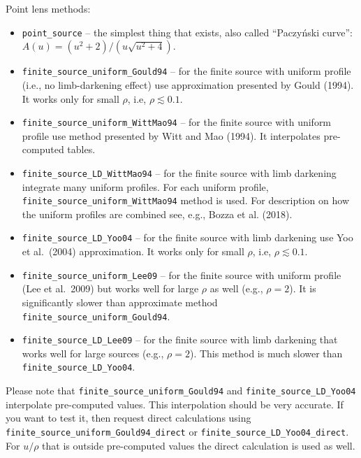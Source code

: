 \documentclass[12pt]{article}
\begin{document}
\bigskip\bigskip
Point lens methods:
\begin{itemize}
\item {\tt point\_source} -- the simplest thing that exists, also called ``Paczy\'nski curve'':\linebreak $A(u) = \left(u^2+2\right)/\left(u\sqrt{u^2+4}\right)$.
\item {\tt finite\_source\_uniform\_Gould94} -- for the finite source with uniform profile (i.e., no limb-darkening effect) use approximation presented by Gould (1994).  It works only for small $\rho$, i.e, $\rho\lesssim0.1$.
\item {\tt finite\_source\_uniform\_WittMao94} -- for the finite source with uniform profile use method presented by Witt and Mao (1994).  It interpolates pre-computed tables.
\item {\tt finite\_source\_LD\_WittMao94} -- for the finite source with limb darkening integrate many uniform profiles. For each uniform profile, {\tt finite\_source\_uniform\_WittMao94} method is used. For description on how the uniform profiles are combined see, e.g., Bozza et al. (2018).
\item {\tt finite\_source\_LD\_Yoo04} -- for the finite source with limb darkening use Yoo et al.~(2004) approximation.  It works only for small $\rho$, i.e, $\rho\lesssim0.1$.
\item {\tt finite\_source\_uniform\_Lee09} -- for the finite source with uniform profile (Lee et al.~2009) but works well for large $\rho$ as well (e.g., $\rho = 2$).  It is significantly slower than approximate method {\tt finite\_source\_uniform\_Gould94}.
\item {\tt finite\_source\_LD\_Lee09} -- for the finite source with limb darkening that works well for large sources (e.g., $\rho = 2$).  This method is much slower than {\tt finite\_source\_LD\_Yoo04}.
\end{itemize}
Please note that {\tt finite\_source\_uniform\_Gould94} and {\tt finite\_source\_LD\_Yoo04} interpolate pre-com\-pu\-ted values.  This interpolation should be very accurate.
If you want to test it, then request direct calculations using {\tt finite\_source\_uniform\_Gould94\_direct} or {\tt finite\_source\_LD\_Yoo04\_direct}.
For $u/\rho$ that is outside pre-computed values the direct calculation is used as well.
\end{document}
